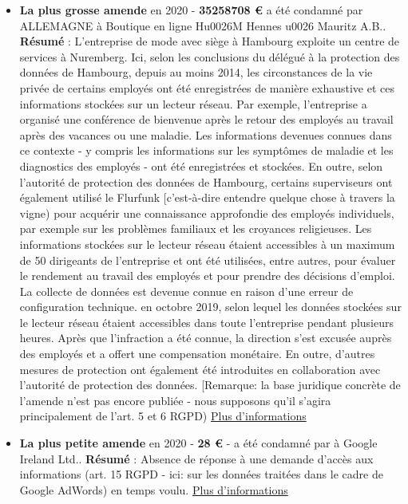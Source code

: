 \documentclass[french]{article}
\begin{document}
\newpage
\justify
	\begin{multicols}{2}
	\begin{itemize}
		\item \textbf{La plus grosse amende} en 2020 - \textbf{35258708 €} a été condamné par ALLEMAGNE à Boutique en ligne Hu0026M Hennes u0026 Mauritz A.B..
		\newline
		\textbf{Résumé} : L'entreprise de mode avec siège à Hambourg exploite un centre de services à Nuremberg. Ici, selon les conclusions du délégué à la protection des données de Hambourg, depuis au moins 2014, les circonstances de la vie privée de certains employés ont été enregistrées de manière exhaustive et ces informations stockées sur un lecteur réseau. Par exemple, l'entreprise a organisé une conférence de bienvenue après le retour des employés au travail après des vacances ou une maladie. Les informations devenues connues dans ce contexte - y compris les informations sur les symptômes de maladie et les diagnostics des employés - ont été enregistrées et stockées. En outre, selon l'autorité de protection des données de Hambourg, certains superviseurs ont également utilisé le Flurfunk [c'est-à-dire entendre quelque chose à travers la vigne) pour acquérir une connaissance approfondie des employés individuels, par exemple sur les problèmes familiaux et les croyances religieuses. Les informations stockées sur le lecteur réseau étaient accessibles à un maximum de 50 dirigeants de l'entreprise et ont été utilisées, entre autres, pour évaluer le rendement au travail des employés et pour prendre des décisions d'emploi. La collecte de données est devenue connue en raison d'une erreur de configuration technique. en octobre 2019, selon lequel les données stockées sur le lecteur réseau étaient accessibles dans toute l'entreprise pendant plusieurs heures. Après que l'infraction a été connue, la direction s'est excusée auprès des employés et a offert une compensation monétaire. En outre, d'autres mesures de protection ont également été introduites en collaboration avec l'autorité de protection des données. [Remarque: la base juridique concrète de l'amende n'est pas encore publiée - nous supposons qu'il s'agira principalement de l'art. 5 et 6 RGPD)
		\newline
		\href{https://datenschutz-hamburg.de/pressemitteilungen/2020/10/2020-10-01-h-m-verfahren}{Plus d'informations}
		\vspace{1cm}
	
		\item \textbf{La plus petite amende} en 2020 - \textbf{28 €} -  a été condamné par  à Google Ireland Ltd..
		\newline
		\textbf{Résumé} : Absence de réponse à une demande d'accès aux informations (art. 15 RGPD - ici: sur les données traitées dans le cadre de Google AdWords) en temps voulu.
		\newline
		\href{https://www.naih.hu/files/NAIH-2020-5553-hatarozat.pdf}{Plus d'informations}
	\end{itemize}
	\end{multicols}
\end{document}
